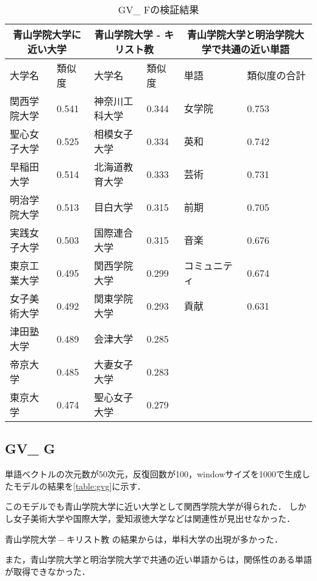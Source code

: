 \begin{table}[H]
\caption{GV\_ Fの検証結果}
\centering
\footnotesize
\begin{tabular}{ll|ll|ll}
\hline
\multicolumn{2}{c}{青山学院大学に近い大学} & \multicolumn{2}{c}{青山学院大学 - キリスト教} & \multicolumn{2}{c}{青山学院大学と明治学院大学で共通の近い単語}
\\ \hline
大学名 & 類似度 & 大学名 & 類似度 & 単語 & 類似度の合計
\\ \hline \hline
関西学院大学 & 0.541 & 神奈川工科大学 & 0.344 & 女学院 & 0.753\\
聖心女子大学 & 0.525 & 相模女子大学 & 0.334 & 英和 & 0.742\\
早稲田大学 & 0.514 & 北海道教育大学 & 0.333 & 芸術 & 0.731\\
明治学院大学 & 0.513 & 目白大学 & 0.315 & 前期 & 0.705\\
実践女子大学 & 0.503 & 国際連合大学 & 0.315 & 音楽 & 0.676\\
東京工業大学 & 0.495 & 関西学院大学 & 0.299 & コミュニティ & 0.674\\
女子美術大学 & 0.492 & 関東学院大学 & 0.293 & 貢献 & 0.631\\
津田塾大学 & 0.489 & 会津大学 & 0.285 & & \\
帝京大学 & 0.485 & 大妻女子大学 & 0.283 & & \\
東京大学 & 0.474 & 聖心女子大学 & 0.279 & & \\ \hline
\end{tabular}
\label{table:gvf}
\end{table}


\subsection{GV\_ G}
単語ベクトルの次元数が50次元，反復回数が100，windowサイズを1000で生成したモデルの結果を\ref{table:gvg}に示す．

このモデルでも青山学院大学に近い大学として関西学院大学が得られた．
しかし女子美術大学や国際大学，愛知淑徳大学などは関連性が見出せなかった．

$ 青山学院大学 - キリスト教 $ の結果からは，単科大学の出現が多かった．

また，青山学院大学と明治学院大学で共通の近い単語からは，関係性のある単語が取得できなかった．

